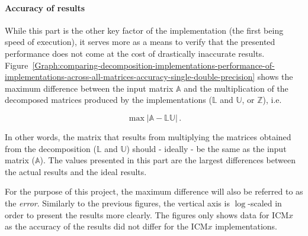 \paragraph{Accuracy of results} While this part is the other key factor of the implementation (the first being speed of execution), it serves more as a means to verify that the presented performance does not come at the cost of drastically inaccurate results. Figure~\ref{Graph:comparing-decomposition-implementations-performance-of-implementations-across-all-matrices-accuracy-single-double-precision} shows the maximum difference between the input matrix $ \mathbb{A} $ and the multiplication of the decomposed matrices produced by the implementations ($ \mathbb{L} $ and $ \mathbb{U} $, or $ \mathbb{Z} $), i.e.

\begin{equation}
	\max\left| \mathbb{A} - \mathbb{L}\mathbb{U}\right| \nonumber \,.
\end{equation}

In other words, the matrix that results from multiplying the matrices obtained from the decomposition ($ \mathbb{L} $ and $ \mathbb{U} $) should - ideally - be the same as the input matrix ($ \mathbb{A} $). The values presented in this part are the largest differences between the actual results and the ideal results.
\par For the purpose of this project, the maximum difference will also be referred to as the \textit{error}. Similarly to the previous figures, the vertical axis is $ \log $-scaled in order to present the results more clearly. The figures only shows data for ICM$ x $ as the accuracy of the results did not differ for the ICM$ x $ implementations.

